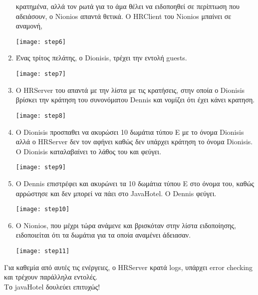 \begin{enumerate}
    κρατημένα, αλλά τον ρωτά για το άμα θέλει να ειδοποηθεί σε περίπτωση που
    αδειάσουν, ο Nionios απαντά θετικά.
    Ο HRClient του Nionios μπαίνει σε αναμονή,
\begin{center}
    \texttt{[image: step6]}
\end{center}
\item Ένας τρίτος πελάτης, ο Dionisis, τρέχει την εντολή guests.
\begin{center}
    \texttt{[image: step7]}
\end{center}
\item Ο HRServer του απαντά με την λίστα με τις κρατήσεις, στην οποία ο 
    Dionisis βρίσκει την κράτηση του συνονόματου Dennis και νομίζει ότι έχει
    κάνει κρατηση.
\begin{center}
    \texttt{[image: step8]}
\end{center}
\item Ο Dionisis προσπαθει να ακυρώσει 10 δωμάτια τύπου E με το όνομα Dionisis
    αλλά ο HRServer δεν τον αφήνει καθώς δεν υπάρχει κράτηση το όνομα Dionisis.
    Ο Dionisis καταλαβαίνει το λάθος του και φεύγει.
\begin{center}
    \texttt{[image: step9]}
\end{center}
\item Ο Dennis επιστρέφει και ακυρώνει τα 10 δωμάτια τύπου Ε στο όνομα του,
    καθώς αρρώστησε και δεν μπορεί να πάει στο JavaHotel. Ο Dennis φεύγει.
\begin{center}
    \texttt{[image: step10]}
\end{center}
\item Ο Nionios, που μέχρι τώρα ανάμενε και βρισκόταν στην λίστα ειδοποίησης,
    ειδοποιείται ότι τα δωμάτια για τα οποία αναμένει άδειασαν.
\begin{center}
    \texttt{[image: step11]}
\end{center}
\end{enumerate}
Για καθεμία από αυτές τις ενέργειες, ο HRServer κρατά logs, υπάρχει error
checking και τρέχουν παράλληλα εντολές.
\\
Το javaHotel δουλεύει επιτυχώς!

